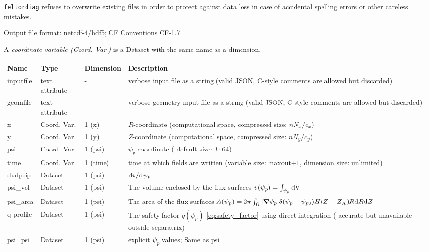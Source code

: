 \begin{tcolorbox}[title=Note]
\texttt{feltordiag} refuses to overwrite existing files in order to protect against data loss in case of accidental spelling
errors or other careless mistakes.
\end{tcolorbox}

Output file format: \href{https://www.unidata.ucar.edu/software/netcdf/docs/}{netcdf-4/hdf5};
\href{http://cfconventions.org/Data/cf-conventions/cf-conventions-1.7/cf-conventions.html}{CF Conventions CF-1.7}

A \textit{coordinate variable (Coord. Var.)} is a Dataset with the same name as a dimension.

\begin{longtable}{lll>{\RaggedRight}p{7cm}}
\toprule
\rowcolor{gray!50}\textbf{Name} &  \textbf{Type} & \textbf{Dimension} & \textbf{Description}  \\ \midrule
inputfile  &     text attribute & - & verbose input file as a string (valid JSON, C-style comments are allowed but discarded) \\
geomfile   &     text attribute & - & verbose geometry input file as a string (valid JSON, C-style comments are allowed but discarded) \\
x                & Coord. Var. & 1 (x) & $R$-coordinate (computational space, compressed size: $nN_x/c_x$)\\
y                & Coord. Var. & 1 (y) & $Z$-coordinate (computational space, compressed size: $nN_y/c_y$)\\
psi              & Coord. Var. & 1 (psi) & $\psi_p$-coordinate ( default size: $3\cdot 64$) \\
time             & Coord. Var. & 1 (time)& time at which fields are written (variable size: maxout$+1$, dimension size: unlimited) \\
dvdpsip          & Dataset & 1 (psi) & $\mathrm{d} v/\mathrm{d}\psi_p$ \\
psi\_vol         & Dataset & 1 (psi) & The volume enclosed by the flux surfaces $v(\psi_p) = \int_{\psi_p} \mathrm{dV}\, $ \\
psi\_area        & Dataset & 1 (psi) & The area of the flux surfaces $A(\psi_p) = 2\pi \int_\Omega |{\boldsymbol{\nabla}}\psi_p| \delta(\psi_p - \psi_{p0}) H(Z-Z_X) R\mathrm{d} R\mathrm{d} Z$ \\
q-profile        & Dataset & 1 (psi) & The safety factor $q(\psi_p)$ \eqref{eq:safety_factor} using direct integration ( accurate but unavailable outside separatrix) \\
psi\_psi         & Dataset & 1 (psi) & explicit $\psi_p$ values; Same as psi \\

\end{longtable}
